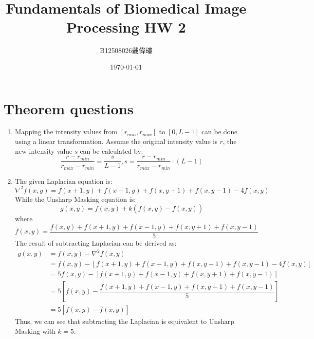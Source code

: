 \documentclass[12pt,a4paper]{article}
\title{Fundamentals of Biomedical Image Processing HW 2}
\author{B12508026戴偉璿}
\date{\today}
\begin{document}
\maketitle
{}

\section{Theorem questions}
\begin{enumerate}
    \item Mapping the intensity values from $[r_{min}, r_{max}]$ to $[0, L-1]$ can be done using a linear transformation. Assume the original intensity value is $r$, the new intensity value $s$ can be calculated by:
    $$\dfrac{r-r_{min}}{r_{max}-r_{min}}=\dfrac{s}{L-1}, s=\dfrac{r-r_{min}}{r_{max}-r_{min}}\cdot (L-1)$$
    \item The given Laplacian equation is:
    $$\nabla^2 f(x, y) = f(x+1, y) + f(x-1, y) + f(x, y+1) + f(x, y-1) - 4f(x, y)$$
    While the Unsharp Masking equation is: 
    $$g(x, y) = f(x, y) + k(f(x, y)-\overline{f}(x, y))$$
    where $\overline{f}(x, y) = \dfrac{f(x, y) + f(x+1, y) + f(x-1, y) + f(x, y+1) + f(x, y-1)}{5}$ \\
    The result of subtracting Laplacian can be derived as:
    \begin{align*}
        g(x, y) &= f(x, y) - \nabla^2 f(x, y) \\
        &= f(x, y) - [f(x+1, y) + f(x-1, y) + f(x, y+1) + f(x, y-1) - 4f(x, y)] \\
        &= 5f(x, y) - [f(x+1, y) + f(x-1, y) + f(x, y+1) + f(x, y-1)] \\
        &= 5\left[f(x, y) - \dfrac{f(x+1, y) + f(x-1, y) + f(x, y+1) + f(x, y-1)}{5}\right] \\
        &= 5[f(x, y) - \overline{f}(x, y)]
    \end{align*}
    Thus, we can see that subtracting the Laplacian is equivalent to Unsharp Masking with $k=5$.
\end{enumerate}

\newpage
\end{document}
